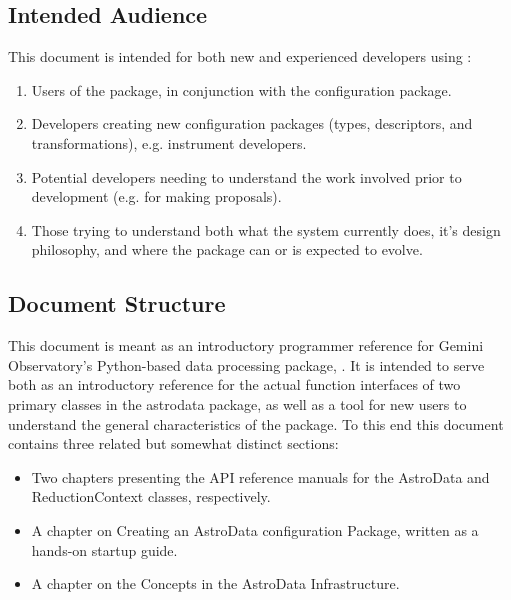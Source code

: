 \documentclass[letterpaper,10pt,english]{sphinxmanual}
\begin{document}
\subsection{Intended Audience}
\label{gen.ADMANUAL_Purpose:intended-audience}
This document is intended for both new and experienced developers using
:
\begin{enumerate}
\item {} 
Users of the  package, in conjunction with the
 configuration package.

\item {} 
Developers creating new configuration packages (types,
descriptors, and transformations), e.g. instrument developers.

\item {} 
Potential developers needing to understand the work involved prior
to development (e.g. for making proposals).

\item {} 
Those trying to understand both what the system currently does,
it's design philosophy, and where the package can or is expected to
evolve.

\end{enumerate}


\subsection{Document Structure}
\label{gen.ADMANUAL_Purpose:document-structure}
This document is meant as an introductory programmer reference for Gemini
Observatory's Python-based data processing package, . It is
intended to serve both as an introductory reference for the actual
function interfaces of two primary classes in the astrodata package,
as well as a tool for new users to understand the general
characteristics of the package. To this end this document contains
three related but somewhat distinct sections:
\begin{itemize}
\item {} 
Two chapters presenting the API reference
manuals for the AstroData and ReductionContext classes, respectively.

\item {} 
A chapter on Creating an AstroData configuration Package, written as
a hands-on startup guide.

\item {} 
A chapter on the Concepts in the AstroData Infrastructure.

\end{itemize}
\end{document}
